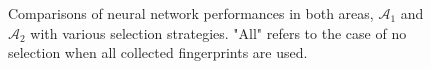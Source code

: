 \documentclass{article}
\begin{document}
	\begin{figure}[h]                                                 
		
		\caption{Comparisons of neural network performances in both areas, $\mathcal{A}_1$ and $\mathcal{A}_2$ with various selection strategies. "All" refers to the case of no selection when all collected fingerprints are used.}
	\end{figure}	
\end{document}
